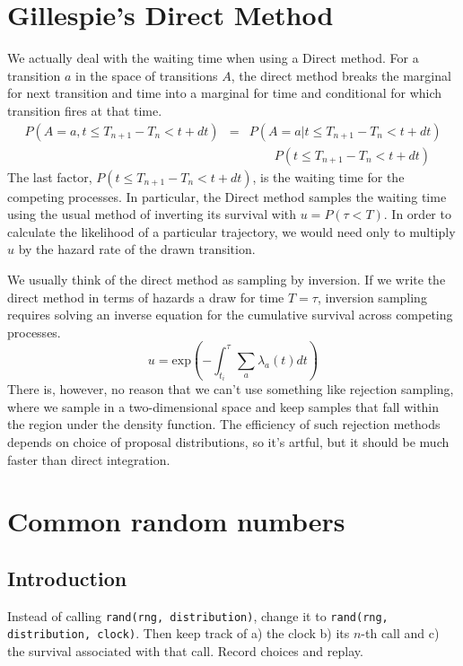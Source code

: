 \documentclass{article}
\begin{document}
\section{Gillespie's Direct Method}

We actually deal with the waiting time when using a Direct method. For a transition $a$ in the space of transitions $A$, the direct method breaks the marginal for next transition and time into a marginal for time and conditional for which transition fires at that time.
\begin{eqnarray*}
	P(A=a, t\le T_{n+1}-T_n<t+dt) &=& P(A=a|t\le T_{n+1}-T_n<t+dt) \\
	& & \qquad P(t\le T_{n+1}-T_n<t+dt)
\end{eqnarray*}
The last factor, $P(t\le T_{n+1}-T_n<t+dt)$, is the waiting time for the competing processes. In particular, the Direct method samples the waiting time using the usual method of inverting its survival with $u=P(\tau<T)$. In order to calculate the likelihood of a particular trajectory, we would need only to multiply $u$ by the hazard rate of the drawn transition.

We usually think of the direct method as sampling by inversion. If we write the direct method in terms of hazards a draw for time $T=\tau$, inversion sampling requires solving an inverse equation for the cumulative survival across competing processes.
\begin{equation}
	u = \mbox{exp}\left(-\int_{t_i}^\tau\sum_a \lambda_a(t)dt\right)
\end{equation}
There is, however, no reason that we can't use something like rejection sampling, where we sample in a two-dimensional space and keep samples that fall within the region under the density function. The efficiency of such rejection methods depends on choice of proposal distributions, so it's artful, but it should be much faster than direct integration.


\section{Common random numbers}

\subsection{Introduction}

Instead of calling \texttt{rand(rng, distribution)}, change it to \texttt{rand(rng, distribution, clock)}. Then keep track of a) the clock b) its $n$-th call and c) the survival associated with that call. Record choices and replay.
\end{document}
